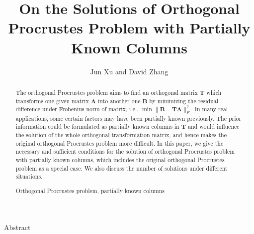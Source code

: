 \documentclass[titlepage,11pt,twoside]{article}
\begin{document}

\title{On the Solutions of Orthogonal Procrustes Problem with Partially Known Columns}

\author{Jun Xu and David Zhang }






\begin{center}\vskip3pt


\vspace{32pt}

Abstract\vskip3pt

\end{center}


\begin{abstract}
The orthogonal Procrustes problem aims to find an orthogonal matrix $\mathbf{T}$ which transforms one given matrix $\mathbf{A}$ into another one $\mathbf{B}$ by minimizing the residual difference under Frobenius norm of matrix, i.e., $\min\|\mathbf{B}-\mathbf{T}\mathbf{A}\|_{F}^{2}$. In many real applications, some certain factors may have been partially known previously. The prior information could be formulated as partially known columns in $\mathbf{T}$ and would influence the solution of the whole orthogonal transformation matrix, and hence makes the original orthogonal Procrustes problem more difficult. In this paper, we give the necessary and sufficient conditions for the solution of orthogonal Procrustes problem with partially known columns, which includes the original orthogonal Procrustes problem as a special case. We also discuss the number of solutions under different situations.
\begin{keywords}
Orthogonal Procrustes problem, partially known columns
\end{keywords}
\end{abstract}
\end{document}
